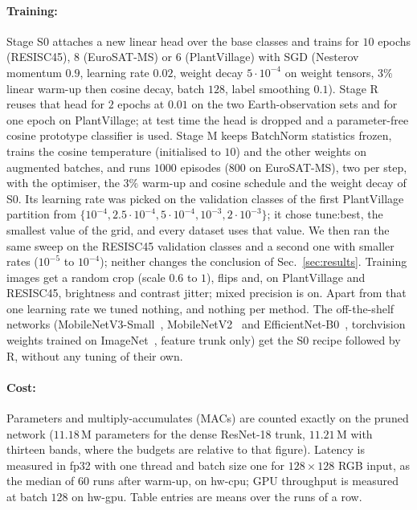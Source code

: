 \paragraph{Training:}
Stage S0 attaches a new linear head over the base classes and trains for $10$ epochs (RESISC45), $8$ (EuroSAT-MS) or $6$ (PlantVillage) with SGD (Nesterov momentum $0.9$, learning rate $0.02$, weight decay $5{\cdot}10^{-4}$ on weight tensors, $3\%$ linear warm-up then cosine decay, batch $128$, label smoothing $0.1$). Stage R reuses that head for $2$ epochs at $0.01$ on the two Earth-observation sets and for one epoch on PlantVillage; at test time the head is dropped and a parameter-free cosine prototype classifier is used. Stage M keeps BatchNorm statistics frozen, trains the cosine temperature (initialised to $10$) and the other weights on augmented batches, and runs $1000$ episodes ($800$ on EuroSAT-MS), two per step, with the optimiser, the $3\%$ warm-up and cosine schedule and the weight decay of S0. Its learning rate was picked on the validation classes of the first PlantVillage partition from $\{10^{-4},2.5{\cdot}10^{-4},5{\cdot}10^{-4},10^{-3},2{\cdot}10^{-3}\}$; it chose \num{tune:best}, the smallest value of the grid, and every dataset uses that value. We then ran the same sweep on the RESISC45 validation classes and a second one with smaller rates ($10^{-5}$ to $10^{-4}$); neither changes the conclusion of Sec.~\ref{sec:results}. Training images get a random crop (scale $0.6$ to $1$), flips and, on PlantVillage and RESISC45, brightness and contrast jitter; mixed precision is on. Apart from that one learning rate we tuned nothing, and nothing per method. The off-the-shelf networks (MobileNetV3-Small~\cite{howard2019mobilenetv3}, MobileNetV2~\cite{sandler2018mobilenetv2} and EfficientNet-B0~\cite{tan2019efficientnet}, torchvision weights trained on ImageNet~\cite{russakovsky2015imagenet}, feature trunk only) get the S0 recipe followed by R, without any tuning of their own.

\paragraph{Cost:}
Parameters and multiply-accumulates (MACs) are counted exactly on the pruned network ($11.18$\,M parameters for the dense ResNet-18 trunk, $11.21$\,M with thirteen bands, where the budgets are relative to that figure). Latency is measured in fp32 with one thread and batch size one for $128{\times}128$ RGB input, as the median of $60$ runs after warm-up, on \num{hw-cpu}; GPU throughput is measured at batch $128$ on \num{hw-gpu}. Table entries are means over the runs of a row.


